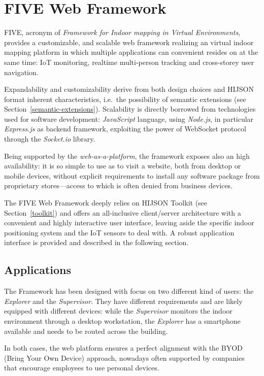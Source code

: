 \section{FIVE Web Framework}\label{framework}

FIVE, acronym of \emph{Framework for Indoor mapping in Virtual Environments},
provides a customizable, and scalable web framework realizing an virtual
indoor mapping platform in which multiple applications can convenient resides
on at the same time: IoT monitoring, realtime multi-person tracking and
cross-storey user navigation.

Expandability and customizability derive from both design choices and
HIJSON format inherent characteristics, i.e.~the possibility of semantic extensions (see Section~\ref{semantic-extensions}).
Scalability is directly borrowed from technologies used for
software development: \emph{JavaScript} language, using \emph{Node.js},
in particular \emph{Express.js} as backend framework, exploiting the
power of WebSocket protocol through the \emph{Socket.io} library.

Being supported by the \emph{web-as-a-platform}, the framework exposes
also an high availability: it is so simple to use as to visit a
website, both from desktop or mobile devices, without explicit
requirements to install any software package from proprietary stores---access to
which is often denied from business devices.

The FIVE Web Framework deeply relies on HIJSON Toolkit (see Section~\ref{toolkit}) and offers an
all-inclusive client/server architecture with a convenient and highly interactive
user interface, leaving aside the specific indoor positioning system and
the IoT sensors to deal with. A robust application interface is provided and
described in the following section.

\subsection{Applications}\label{applications}

The Framework has been designed with focus on two different kind of
users: the \emph{Explorer} and the \emph{Supervisor}. They have
different requirements and are likely equipped with different devices:
while the \emph{Supervisor} monitors the indoor environment through a
desktop workstation, the \emph{Explorer} has a smartphone available and
needs to be routed across the building.

In both cases, the web platform ensures a perfect alignment with the
BYOD (Bring Your Own Device) approach, nowadays often supported by companies
that encourage employees to use personal devices.


